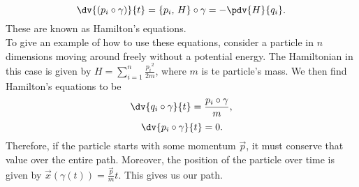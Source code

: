 \documentclass{article}
\begin{document}
\begin{multicols}{2}
\begin{equation}
		\dv{(p_i\circ\gamma)}{t} = \{p_i,\,H\}\circ\gamma = -\pdv{H}{q_i}.
	\end{equation}
	These are known as Hamilton's equations.\\
	To give an example of how to use these equations, consider a particle in \(n\) dimensions moving around freely without a potential energy.
	The Hamiltonian in this case is given by \(H = \sum_{i=1}^n\frac{{p_i}^2}{2m}\), where \(m\) is te particle's mass. We then find Hamilton's equations to be
	\begin{equation}
		\dv{q_i\circ\gamma}{t} = \frac{p_i\circ\gamma}{m},
	\end{equation}
	\begin{equation}
		\dv{p_i\circ\gamma}{t} = 0.
	\end{equation}
	Therefore, if the particle starts with some momentum \(\vec{p}\), it must conserve that value over the entire path.
	Moreover, the position of the particle over time is given by \(\vec{x}(\gamma(t)) = \frac{\vec{p}}{m}t\). This gives us our path.

\end{multicols}
\end{document}
